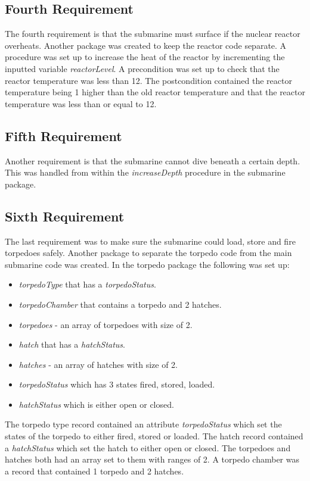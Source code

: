 \subsection{Fourth Requirement}
The fourth requirement is that the submarine must surface if the nuclear reactor overheats. Another package was created to keep the reactor code separate.  A procedure was set up to increase the heat of the reactor by incrementing the inputted variable \textit{reactorLevel}. A precondition was set up to check that the reactor temperature was less than 12. The postcondition contained the reactor temperature being 1 higher than the old reactor temperature and that the reactor temperature was less than or equal to 12.

\subsection{Fifth Requirement}
Another requirement is that the submarine cannot dive beneath a certain depth. This was handled from within the \textit{increaseDepth} procedure in the submarine package.

\subsection{Sixth Requirement}
The last requirement was to make sure the submarine could load, store and fire torpedoes safely. Another package to separate the torpedo code from the main submarine code was created. In the torpedo package the following was set up: \begin{itemize}
	\item \textit{torpedoType} that has a \textit{torpedoStatus}. 
	\item \textit{torpedoChamber} that contains a torpedo and 2 hatches.
	\item \textit{torpedoes} - an array of torpedoes with size of 2.
	\item \textit{hatch} that has a \textit{hatchStatus}.
	\item \textit{hatches} - an array of hatches with size of 2.
	\item \textit{torpedoStatus} which has 3 states fired, stored, loaded.
	\item \textit{hatchStatus} which is either open or closed.
\end{itemize}

The torpedo type record contained an attribute \textit{torpedoStatus} which set the states of the torpedo to either fired, stored or loaded. The hatch record contained a \textit{hatchStatus} which set the hatch to either open or closed. The torpedoes and hatches both had an array set to them with ranges of 2. A torpedo chamber was a record that contained 1 torpedo and 2 hatches.

